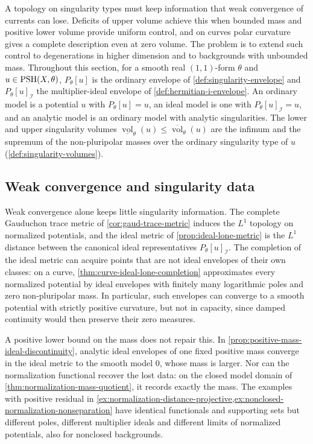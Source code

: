 A topology on singularity types must keep information that weak convergence of currents can lose. Deficits of upper volume achieve this when bounded mass and positive lower volume provide uniform control, and on curves polar curvature gives a complete description even at zero volume. The problem is to extend such control to degenerations in higher dimension and to backgrounds with unbounded mass. Throughout this section, for a smooth real $(1,1)$-form $\theta$ and $u\in\mathrm{PSH}(X,\theta)$, $P_\theta[u]$ is the ordinary envelope of \cref{def:singularity-envelope} and $P_\theta[u]_{\mathcal I}$ the multiplier-ideal envelope of \cref{def:hermitian-i-envelope}. An ordinary model is a potential $u$ with $P_\theta[u]=u$, an ideal model is one with $P_\theta[u]_{\mathcal I}=u$, and an analytic model is an ordinary model with analytic singularities. The lower and upper singularity volumes $\underline{\operatorname{vol}}_\theta(u)\leq\overline{\operatorname{vol}}_\theta(u)$ are the infimum and the supremum of the non-pluripolar masses over the ordinary singularity type of $u$ (\cref{def:singularity-volumes}).

\subsection{Weak convergence and singularity data}

Weak convergence alone keeps little singularity information. The complete Gauduchon trace metric of \cref{cor:gaud-trace-metric} induces the $L^1$ topology on normalized potentials, and the ideal metric of \cref{prop:ideal-lone-metric} is the $L^1$ distance between the canonical ideal representatives $P_\theta[u]_{\mathcal I}$. The completion of the ideal metric can acquire points that are not ideal envelopes of their own classes: on a curve, \cref{thm:curve-ideal-lone-completion} approximates every normalized potential by ideal envelopes with finitely many logarithmic poles and zero non-pluripolar mass. In particular, such envelopes can converge to a smooth potential with strictly positive curvature, but not in capacity, since damped continuity would then preserve their zero measures.

A positive lower bound on the mass does not repair this. In \cref{prop:positive-mass-ideal-discontinuity}, analytic ideal envelopes of one fixed positive mass converge in the ideal metric to the smooth model $0$, whose mass is larger. Nor can the normalization functional recover the lost data: on the closed model domain of \cref{thm:normalization-mass-quotient}, it records exactly the mass. The examples with positive residual in \cref{ex:normalization-distance-projective,ex:nonclosed-normalization-nonseparation} have identical functionals and supporting sets but different poles, different multiplier ideals and different limits of normalized potentials, also for nonclosed backgrounds.

